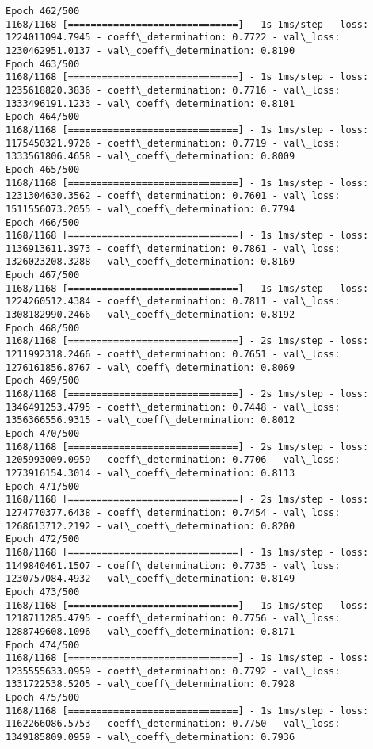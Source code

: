 \documentclass[11pt]{article}
\begin{document}
\begin{Verbatim}[commandchars=\\\{\}]
Epoch 462/500
1168/1168 [==============================] - 1s 1ms/step - loss: 1224011094.7945 - coeff\_determination: 0.7722 - val\_loss: 1230462951.0137 - val\_coeff\_determination: 0.8190
Epoch 463/500
1168/1168 [==============================] - 1s 1ms/step - loss: 1235618820.3836 - coeff\_determination: 0.7716 - val\_loss: 1333496191.1233 - val\_coeff\_determination: 0.8101
Epoch 464/500
1168/1168 [==============================] - 1s 1ms/step - loss: 1175450321.9726 - coeff\_determination: 0.7719 - val\_loss: 1333561806.4658 - val\_coeff\_determination: 0.8009
Epoch 465/500
1168/1168 [==============================] - 1s 1ms/step - loss: 1231304630.3562 - coeff\_determination: 0.7601 - val\_loss: 1511556073.2055 - val\_coeff\_determination: 0.7794
Epoch 466/500
1168/1168 [==============================] - 1s 1ms/step - loss: 1136913611.3973 - coeff\_determination: 0.7861 - val\_loss: 1326023208.3288 - val\_coeff\_determination: 0.8169
Epoch 467/500
1168/1168 [==============================] - 1s 1ms/step - loss: 1224260512.4384 - coeff\_determination: 0.7811 - val\_loss: 1308182990.2466 - val\_coeff\_determination: 0.8192
Epoch 468/500
1168/1168 [==============================] - 2s 1ms/step - loss: 1211992318.2466 - coeff\_determination: 0.7651 - val\_loss: 1276161856.8767 - val\_coeff\_determination: 0.8069
Epoch 469/500
1168/1168 [==============================] - 2s 1ms/step - loss: 1346491253.4795 - coeff\_determination: 0.7448 - val\_loss: 1356366556.9315 - val\_coeff\_determination: 0.8012
Epoch 470/500
1168/1168 [==============================] - 2s 1ms/step - loss: 1205993009.0959 - coeff\_determination: 0.7706 - val\_loss: 1273916154.3014 - val\_coeff\_determination: 0.8113
Epoch 471/500
1168/1168 [==============================] - 2s 1ms/step - loss: 1274770377.6438 - coeff\_determination: 0.7454 - val\_loss: 1268613712.2192 - val\_coeff\_determination: 0.8200
Epoch 472/500
1168/1168 [==============================] - 1s 1ms/step - loss: 1149840461.1507 - coeff\_determination: 0.7735 - val\_loss: 1230757084.4932 - val\_coeff\_determination: 0.8149
Epoch 473/500
1168/1168 [==============================] - 1s 1ms/step - loss: 1218711285.4795 - coeff\_determination: 0.7756 - val\_loss: 1288749608.1096 - val\_coeff\_determination: 0.8171
Epoch 474/500
1168/1168 [==============================] - 1s 1ms/step - loss: 1235555633.0959 - coeff\_determination: 0.7792 - val\_loss: 1331722538.5205 - val\_coeff\_determination: 0.7928
Epoch 475/500
1168/1168 [==============================] - 1s 1ms/step - loss: 1162266086.5753 - coeff\_determination: 0.7750 - val\_loss: 1349185809.0959 - val\_coeff\_determination: 0.7936

\end{Verbatim}
\end{document}
